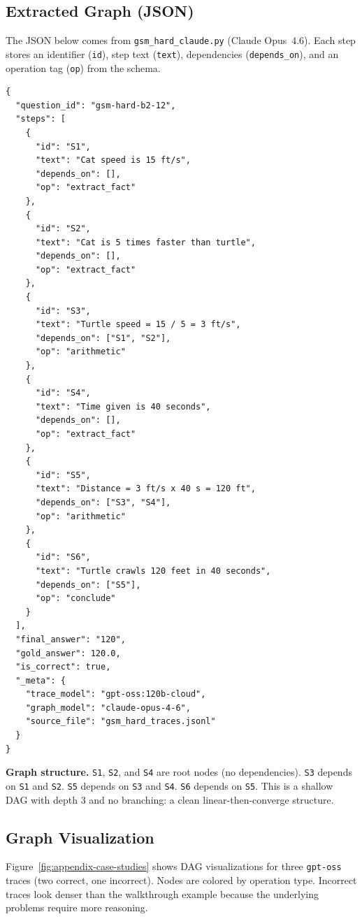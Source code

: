 \documentclass[letterpaper]{article}
\begin{document}
\subsection{Extracted Graph (JSON)}

The JSON below comes from \texttt{gsm\_hard\_claude.py} (Claude Opus~4.6).
Each step stores an identifier (\texttt{id}), step text (\texttt{text}),
dependencies (\texttt{depends\_on}), and an operation tag (\texttt{op})
from the schema.

{\scriptsize
\begin{verbatim}
{
  "question_id": "gsm-hard-b2-12",
  "steps": [
    {
      "id": "S1",
      "text": "Cat speed is 15 ft/s",
      "depends_on": [],
      "op": "extract_fact"
    },
    {
      "id": "S2",
      "text": "Cat is 5 times faster than turtle",
      "depends_on": [],
      "op": "extract_fact"
    },
    {
      "id": "S3",
      "text": "Turtle speed = 15 / 5 = 3 ft/s",
      "depends_on": ["S1", "S2"],
      "op": "arithmetic"
    },
    {
      "id": "S4",
      "text": "Time given is 40 seconds",
      "depends_on": [],
      "op": "extract_fact"
    },
    {
      "id": "S5",
      "text": "Distance = 3 ft/s x 40 s = 120 ft",
      "depends_on": ["S3", "S4"],
      "op": "arithmetic"
    },
    {
      "id": "S6",
      "text": "Turtle crawls 120 feet in 40 seconds",
      "depends_on": ["S5"],
      "op": "conclude"
    }
  ],
  "final_answer": "120",
  "gold_answer": 120.0,
  "is_correct": true,
  "_meta": {
    "trace_model": "gpt-oss:120b-cloud",
    "graph_model": "claude-opus-4-6",
    "source_file": "gsm_hard_traces.jsonl"
  }
}
\end{verbatim}
}

\noindent \textbf{Graph structure.} \texttt{S1}, \texttt{S2}, and
\texttt{S4} are root nodes (no dependencies). \texttt{S3} depends
on \texttt{S1} and \texttt{S2}. \texttt{S5} depends on \texttt{S3}
and \texttt{S4}. \texttt{S6} depends on \texttt{S5}. This is a
shallow DAG with depth 3 and no branching: a clean
linear-then-converge structure.

\subsection{Graph Visualization}

Figure~\ref{fig:appendix-case-studies} shows DAG visualizations for three
\texttt{gpt-oss} traces (two correct, one incorrect). Nodes are colored by
operation type. Incorrect traces look denser than the walkthrough example
because the underlying problems require more reasoning.
\end{document}
